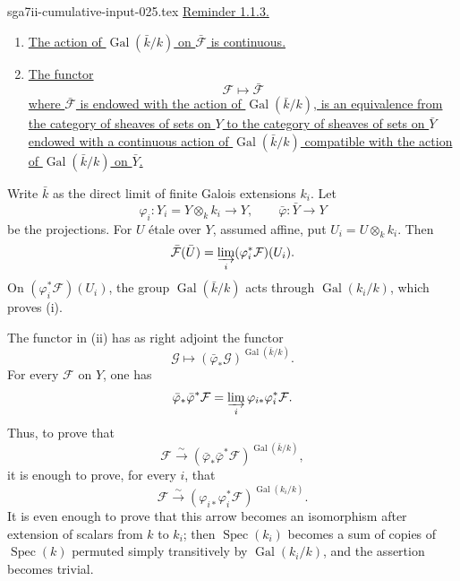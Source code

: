 \begin{filecontents*}{sga7ii-cumulative-input-025.tex}
\underline{Reminder 1.1.3.}
\begin{enumerate}[label=(\roman*),leftmargin=2.7em]
\item \underline{The action of $\operatorname{Gal}(\bar k/k)$ on
$\bar{\mathcal F}$ is continuous.}


\item \underline{The functor}
\begin{equation*}
\mathcal F\longmapsto\bar{\mathcal F}
\end{equation*}
\underline{where $\bar{\mathcal F}$ is endowed with the action of
$\operatorname{Gal}(\bar k/k)$, is an equivalence from the category of sheaves of sets on
$Y$ to the category of sheaves of sets on $\bar Y$ endowed with a
continuous action of $\operatorname{Gal}(\bar k/k)$ compatible with the
action of $\operatorname{Gal}(\bar k/k)$ on $\bar Y$.}
\end{enumerate}

Write $\bar k$ as the direct limit of finite Galois extensions $k_i$.
Let
\begin{equation*}
\varphi_i:Y_i=Y\otimes_k k_i\longrightarrow Y,
\qquad
\bar\varphi:\bar Y\longrightarrow Y
\end{equation*}
be the projections.  For $U$ \'{e}tale over $Y$, assumed affine, put
$U_i=U\otimes_k k_i$.  Then
\begin{equation*}
\bar{\mathcal F}(\bar U)
=\varinjlim_i(\varphi_i^*\mathcal F)(U_i).
\end{equation*}
On $(\varphi_i^*\mathcal F)(U_i)$, the group
$\operatorname{Gal}(\bar k/k)$ acts through
$\operatorname{Gal}(k_i/k)$, which proves (i).

The functor in (ii) has as right adjoint the functor
\begin{equation*}
\mathcal G\longmapsto
(\bar\varphi_*\mathcal G)^{\operatorname{Gal}(\bar k/k)}.
\end{equation*}
For every $\mathcal F$ on $Y$, one has
\begin{equation*}
\bar\varphi_*\bar\varphi^*\mathcal F
=\varinjlim_i\varphi_{i*}\varphi_i^*\mathcal F.
\end{equation*}
Thus, to prove that
\begin{equation*}
\mathcal F\xrightarrow{\sim}
(\bar\varphi_*\bar\varphi^*\mathcal F)^{
  \operatorname{Gal}(\bar k/k)},
\end{equation*}
it is enough to prove, for every $i$, that
\begin{equation*}
\mathcal F\xrightarrow{\sim}
(\varphi_{i*}\varphi_i^*\mathcal F)^{
  \operatorname{Gal}(k_i/k)}.
\end{equation*}
It is even enough to prove that this arrow becomes an isomorphism after
extension of scalars from $k$ to $k_i$; then $\operatorname{Spec}(k_i)$
becomes a sum of copies of $\operatorname{Spec}(k)$ permuted simply
transitively by $\operatorname{Gal}(k_i/k)$, and the assertion becomes
trivial.


\end{filecontents*}
